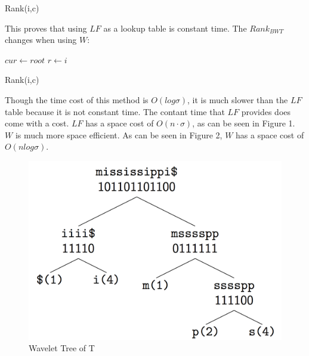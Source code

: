 \documentclass[11pt]{article}
\begin{document}
\newpage

\begin{algorithm}
\DontPrintSemicolon
{}
\BlankLine
{}\label{cmt}

\caption{Rank(i,c)}\label{algo_rank1}
\end{algorithm}

This proves that using $LF$ as a lookup table is constant time. The $Rank_{BWT}$ changes when using $W$:

\begin{algorithm}
\DontPrintSemicolon
{}
\BlankLine
$cur \leftarrow root$ \;
$r \leftarrow i$ \;

\caption{Rank(i,c)}\label{algo_rank2}
\end{algorithm}

Though the time cost of this method is $O(log\sigma)$, it is much slower than the $LF$ table because it is not constant time. The contant time that $LF$ provides does come with a cost. $LF$ has a space cost of $O(n\cdot\sigma)$, as can be seen in Figure 1. $W$ is much more space efficient. As can be seen in Figure 2, $W$ has a space cost of $O(nlog\sigma)$.

\begin{figure}[h!]
\begin{center}
\includegraphics[scale=0.3]{Figure2.png}
\caption{Wavelet Tree of T}
\label{fig:wave}
\end{center}
\end{figure}
\end{document}
